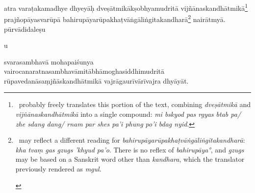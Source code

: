 \documentclass[naipra.tex]{subfiles}
\begin{document}
\begin{sanskrit}


\pstart
atra varaṭakamadhye dhyeyāḥ  dveṣātmikākṣobhyamudritā vijñānaskandhātmikā\footnote{
	\TIB\ probably freely translates this portion of the text, combining \emph{dveṣātmikā} and \emph{vijñānaskandhātmikā} into a single compound: \emph{mi bskyod pas rgyas btab pa/ zhe sdang dang/ rnam par shes pa'i phung po'i bdag nyid}. 
} prajñopāyasvarūpā bahirupāyarūpakhaṭvāṅgāliṅgitakandharā\footnote{\begin{english}
	\TIB\ may reflect a different reading for \emph{bahirupāyarūpakhaṭvāṅgāliṅgitakandharā}: \emph{kha tvaṃ gas gzugs 'khyud pa'o}.
	There is no reflex of \emph{bahirupāya°}, and \emph{gzugs} may be based on a Sanskrit word other than \emph{kandhara}, which the translator previously rendered as \emph{mgul}.
\end{english}} nairātmyā.
pūrvādidaleṣu \begin{mantra}\dsh u\end{mantra}\dsh svarasambhavā mohapaiśunya vairocanaratnasambhavāmitābhāmoghasiddhimudritā rūpavedanāsaṃjñāskandhātmikā vajrāgaurīvārīvajra dhyāyāt. 
\pend



\end{sanskrit}
\end{document}
